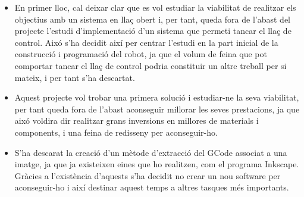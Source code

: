 \begin{itemize}
	\item En primer lloc, cal deixar clar que es vol estudiar la viabilitat de realitzar els objectius amb un sistema en llaç obert i, per tant, queda fora de l'abast del projecte l'estudi d'implementació d'un sistema que permeti tancar el llaç de control. Aixó s'ha decidit així per centrar l'estudi en la part inicial de la construcció i programació del robot, ja que el volum de feina que pot comportar tancar el llaç de control podria constituir un altre treball per si mateix, i per tant s'ha descartat. 
	
	\item Aquest projecte vol trobar una primera solució i estudiar-ne la seva viabilitat, per tant queda fora de l'abast aconseguir millorar les seves prestacions, ja que aixó voldira dir realitzar grans inversions en millores de materials i components, i una feina de redisseny per aconseguir-ho.
	
	\item S'ha descarat la creació d'un mètode d'extracció del GCode associat a una imatge, ja que ja existeixen eines que ho realitzen, com el programa Inkscape. Gràcies a l'existència d'aquests s'ha decidit no crear un nou software per aconseguir-ho i així destinar aquest temps a altres tasques més importants.    
\end{itemize}











